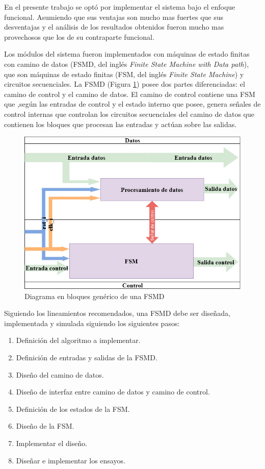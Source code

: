 En el presente trabajo se optó por implementar el sistema bajo el enfoque funcional. Asumiendo que sus ventajas son mucho mas fuertes que sus desventajas y el análisis de los resultados obtenidos fueron mucho mas provechosos que los de su contraparte funcional.

Los módulos del sistema fueron implementados con máquinas de estado finitas con camino de datos (FSMD, del inglés \textit{Finite State Machine with Data path}), que son máquinas de estado finitas (FSM, del inglés \textit{Finite State Machine}) y circuitos secuenciales. La FSMD (Figura \ref{fig:FSMD}) posee dos partes diferenciadas: el camino de control y el camino de datos. El camino de control contiene una FSM que ,según las entradas de control y el estado interno que posee, genera señales de control internas que controlan los circuitos secuenciales del camino de datos que contienen los bloques que procesan las entradas y actúan sobre las salidas.

	\begin{figure}[h]
	\centering
		\includegraphics[scale=.5]{./Figures/FSMD}
		\caption{Diagrama en bloques genérico de una FSMD}
		\label{fig:FSMD}
	\end{figure}
	
	\vspace{5cm}
	
	Siguiendo los lineamientos recomendados, una FSMD debe ser diseñada, implementada y simulada siguiendo los siguientes pasos:
	
	\begin{enumerate}
		\item Definición del algoritmo a implementar.
		\item Definición de entradas y salidas de la FSMD.
		\item Diseño del camino de datos.
		\item Diseño de interfaz entre camino de datos y camino de control.
		\item Definición de los estados de la FSM.
		\item Diseño de la FSM.
		\item Implementar el diseño.
		\item Diseñar e implementar los ensayos.
	\end{enumerate}
	
